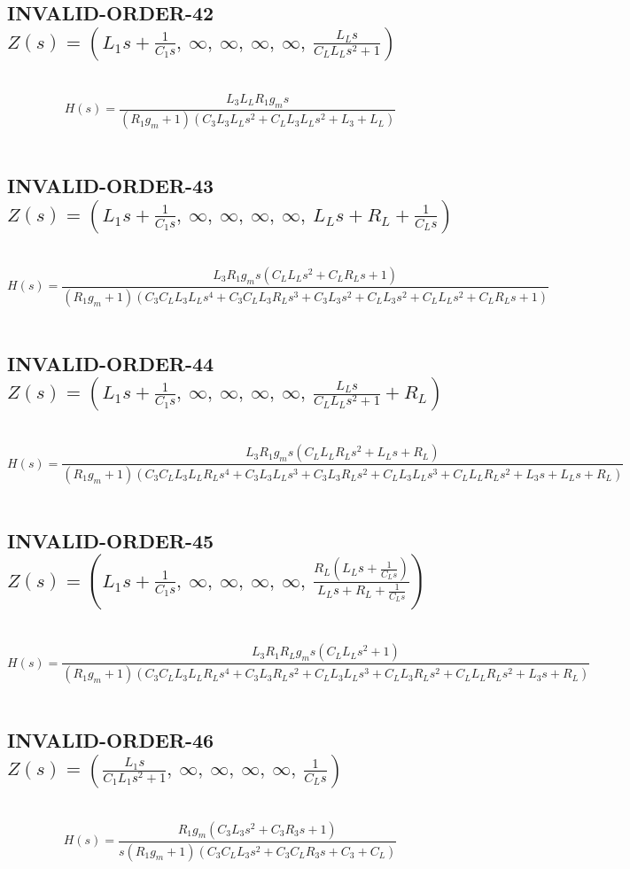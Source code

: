 \documentclass{article}
\begin{document}
\subsection{INVALID-ORDER-42 $Z(s) = \left( L_{1} s + \frac{1}{C_{1} s}, \  \infty, \  \infty, \  \infty, \  \infty, \  \frac{L_{L} s}{C_{L} L_{L} s^{2} + 1}\right)$ } \ 
\textbf{\[H(s) = \frac{L_{3} L_{L} R_{1} g_{m} s}{\left(R_{1} g_{m} + 1\right) \left(C_{3} L_{3} L_{L} s^{2} + C_{L} L_{3} L_{L} s^{2} + L_{3} + L_{L}\right)}\] } \ 
\subsection{INVALID-ORDER-43 $Z(s) = \left( L_{1} s + \frac{1}{C_{1} s}, \  \infty, \  \infty, \  \infty, \  \infty, \  L_{L} s + R_{L} + \frac{1}{C_{L} s}\right)$ } \ 
\textbf{\[H(s) = \frac{L_{3} R_{1} g_{m} s \left(C_{L} L_{L} s^{2} + C_{L} R_{L} s + 1\right)}{\left(R_{1} g_{m} + 1\right) \left(C_{3} C_{L} L_{3} L_{L} s^{4} + C_{3} C_{L} L_{3} R_{L} s^{3} + C_{3} L_{3} s^{2} + C_{L} L_{3} s^{2} + C_{L} L_{L} s^{2} + C_{L} R_{L} s + 1\right)}\] } \ 
\subsection{INVALID-ORDER-44 $Z(s) = \left( L_{1} s + \frac{1}{C_{1} s}, \  \infty, \  \infty, \  \infty, \  \infty, \  \frac{L_{L} s}{C_{L} L_{L} s^{2} + 1} + R_{L}\right)$ } \ 
\textbf{\[H(s) = \frac{L_{3} R_{1} g_{m} s \left(C_{L} L_{L} R_{L} s^{2} + L_{L} s + R_{L}\right)}{\left(R_{1} g_{m} + 1\right) \left(C_{3} C_{L} L_{3} L_{L} R_{L} s^{4} + C_{3} L_{3} L_{L} s^{3} + C_{3} L_{3} R_{L} s^{2} + C_{L} L_{3} L_{L} s^{3} + C_{L} L_{L} R_{L} s^{2} + L_{3} s + L_{L} s + R_{L}\right)}\] } \ 
\subsection{INVALID-ORDER-45 $Z(s) = \left( L_{1} s + \frac{1}{C_{1} s}, \  \infty, \  \infty, \  \infty, \  \infty, \  \frac{R_{L} \left(L_{L} s + \frac{1}{C_{L} s}\right)}{L_{L} s + R_{L} + \frac{1}{C_{L} s}}\right)$ } \ 
\textbf{\[H(s) = \frac{L_{3} R_{1} R_{L} g_{m} s \left(C_{L} L_{L} s^{2} + 1\right)}{\left(R_{1} g_{m} + 1\right) \left(C_{3} C_{L} L_{3} L_{L} R_{L} s^{4} + C_{3} L_{3} R_{L} s^{2} + C_{L} L_{3} L_{L} s^{3} + C_{L} L_{3} R_{L} s^{2} + C_{L} L_{L} R_{L} s^{2} + L_{3} s + R_{L}\right)}\] } \ 
\subsection{INVALID-ORDER-46 $Z(s) = \left( \frac{L_{1} s}{C_{1} L_{1} s^{2} + 1}, \  \infty, \  \infty, \  \infty, \  \infty, \  \frac{1}{C_{L} s}\right)$ } \ 
\textbf{\[H(s) = \frac{R_{1} g_{m} \left(C_{3} L_{3} s^{2} + C_{3} R_{3} s + 1\right)}{s \left(R_{1} g_{m} + 1\right) \left(C_{3} C_{L} L_{3} s^{2} + C_{3} C_{L} R_{3} s + C_{3} + C_{L}\right)}\] } \ 
\end{document}
